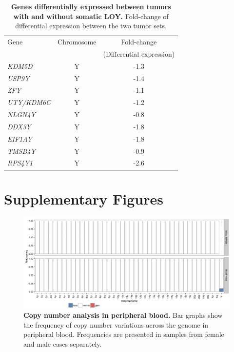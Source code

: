 \begin{table}[ht]
  \centering
  \begin{tabular}{lcc}
    Gene           & Chromosome & Fold-change               \\
                   &            & (Differential expression) \\
    \hline
   {\it KDM5D}     & Y          & -1.3                      \\
   {\it USP9Y}     & Y          & -1.4                      \\
   {\it ZFY}       & Y          & -1.1                      \\
   {\it UTY/KDM6C} & Y          & -1.2                      \\
   {\it NLGN4Y}    & Y          & -0.8                      \\
   {\it DDX3Y}     & Y          & -1.8                      \\
   {\it EIF1AY}    & Y          & -1.8                      \\
   {\it TMSB4Y}    & Y          & -0.9                      \\
   {\it RPS4Y1}    & Y          & -2.6                      \\
    \hline
  \end{tabular}
  \caption[Genes differentially expressed between tumors with and without somatic LOY]{{\bf Genes differentially expressed between tumors with and without somatic LOY.} {\small Fold-change of differential expression between the two tumor sets.}}
  \label{tab:loyS2}
\end{table}

\clearpage

\section*{Supplementary Figures}

\begin{figure}[ht]
  \centering
  \includegraphics[width=.9\linewidth]{figures/LOY-figS1.png}
  \caption[Copy number analysis in peripheral blood.]{{\bf Copy number analysis in peripheral blood.} {\small Bar graphs show the frequency of copy number variations across the genome in peripheral blood. Frequencies are presented in samples from female and male cases separately.}}
  \label{fig:loyS1}
\end{figure}

